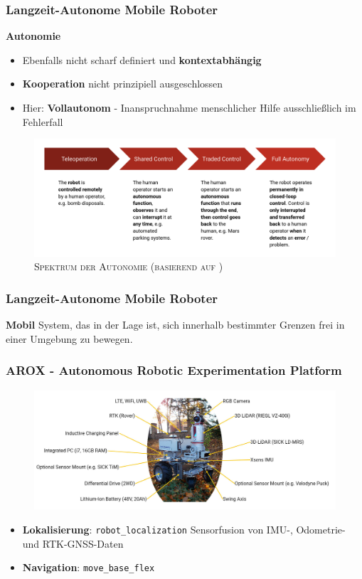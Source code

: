 \documentclass{beamer}
\newcommand{\code}[1]{\colorbox{light-gray}{\texttt{#1}}}
\begin{document}
\begin{frame}
  \frametitle{Langzeit-Autonome Mobile Roboter}
  \textbf{Autonomie}
  \begin{itemize}
    \item Ebenfalls nicht scharf definiert und \textbf{kontextabhängig}
    \item \textbf{Kooperation} nicht prinzipiell ausgeschlossen
    \item Hier: \textbf{Vollautonom} - Inanspruchnahme menschlicher Hilfe ausschließlich im Fehlerfall
  \end{itemize}
  \begin{figure}[H]
    \centering
    \includegraphics[width=\textwidth]{img/autonomy_spectrum.png}
    \caption*{\textsc{Spektrum der Autonomie (basierend auf \cite{Hertzberg:2015})}}
  \end{figure}
\end{frame}

\begin{frame}
  \frametitle{Langzeit-Autonome Mobile Roboter}
  \textbf{Mobil}\newline
  System, das in der Lage ist, sich innerhalb bestimmter Grenzen frei in einer Umgebung zu bewegen. \cite{Hertzberg:2012}
\end{frame}

\begin{frame}
  \frametitle{AROX - Autonomous Robotic Experimentation Platform}
  \begin{figure}[H]
    \centering
    \includegraphics[width=\textwidth]{img/AROX.jpg}
    \caption*{}
  \end{figure}
  \begin{itemize}
    \item \textbf{Lokalisierung}: \code{robot\_localization} \cite{Moore:2014}\newline \textrightarrow \thinspace Sensorfusion von IMU-, Odometrie- und RTK-GNSS-Daten
    \item \textbf{Navigation}: \code{move\_base\_flex} \cite{Puetz:2018}
  \end{itemize}
\end{frame}
\end{document}
